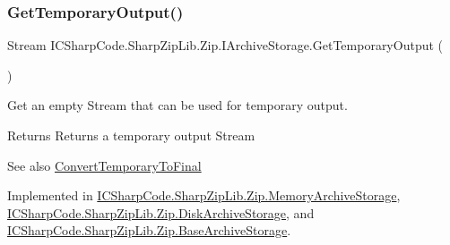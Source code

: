 \mbox{\label{interface_i_c_sharp_code_1_1_sharp_zip_lib_1_1_zip_1_1_i_archive_storage_aa8c04ba6ece88eb03473135299de0a43}} 
\subsubsection{\texorpdfstring{Get\+Temporary\+Output()}{GetTemporaryOutput()}}
{\footnotesize\ttfamily Stream I\+C\+Sharp\+Code.\+Sharp\+Zip\+Lib.\+Zip.\+I\+Archive\+Storage.\+Get\+Temporary\+Output (\begin{DoxyParamCaption}{ }\end{DoxyParamCaption})}



Get an empty Stream that can be used for temporary output. 

\begin{DoxyReturn}{Returns}
Returns a temporary output Stream
\end{DoxyReturn}
\begin{DoxySeeAlso}{See also}
\hyperlink{interface_i_c_sharp_code_1_1_sharp_zip_lib_1_1_zip_1_1_i_archive_storage_aa254436478256b7d33cf2739002346f5}{Convert\+Temporary\+To\+Final}


\end{DoxySeeAlso}


Implemented in \hyperlink{class_i_c_sharp_code_1_1_sharp_zip_lib_1_1_zip_1_1_memory_archive_storage_a0cdd04c578ddab179ae057c4190cffd8}{I\+C\+Sharp\+Code.\+Sharp\+Zip\+Lib.\+Zip.\+Memory\+Archive\+Storage}, \hyperlink{class_i_c_sharp_code_1_1_sharp_zip_lib_1_1_zip_1_1_disk_archive_storage_a5f99f82e221c964f9177c16c7c775e3f}{I\+C\+Sharp\+Code.\+Sharp\+Zip\+Lib.\+Zip.\+Disk\+Archive\+Storage}, and \hyperlink{class_i_c_sharp_code_1_1_sharp_zip_lib_1_1_zip_1_1_base_archive_storage_a1327afcc22749a88959c9d8614cf4c75}{I\+C\+Sharp\+Code.\+Sharp\+Zip\+Lib.\+Zip.\+Base\+Archive\+Storage}.

\mbox{\label{interface_i_c_sharp_code_1_1_sharp_zip_lib_1_1_zip_1_1_i_archive_storage_a90dfbf17d7fd1a9ab9beb7a0b66b8678}} 
